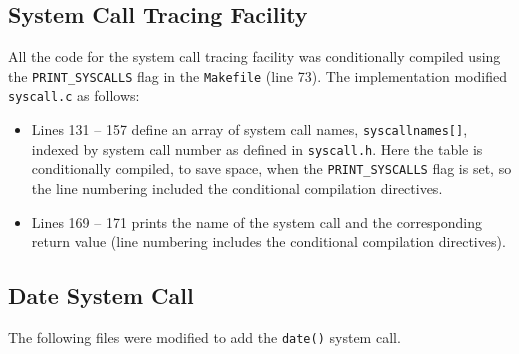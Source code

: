 \documentclass[11pt,letterpaper]{report}
\begin{document}
	
	\subsection*{System Call Tracing Facility}
	All the code for the system call tracing facility was conditionally compiled using the {\tt PRINT\_SYSCALLS} flag in the {\tt Makefile} (line 73). The implementation modified  {\tt syscall.c} as follows:
	\begin{itemize}

	\item {Lines 131 -- 157} define an array of system call names, {\tt syscallnames[]}, indexed by system call number as defined in {\tt syscall.h}. Here the table is conditionally compiled, to save space, when the {\tt PRINT\_SYSCALLS} flag is set, so the line numbering included the conditional compilation directives.
	\item {Lines 169 -- 171} prints the name of the  system call and the corresponding return value (line numbering includes the conditional compilation directives).

	
	\end{itemize}	
	
	\subsection*{Date System Call}
	The following files were modified to add the {\tt date()} system call.
	
\end{document}
